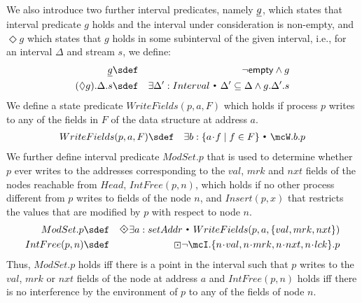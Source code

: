 \documentclass{article}
\def\cdota{\!\cdot\!}
\newcommand{\st}{~{\scriptscriptstyle ^\bullet}~}
\theoremstyle{plain}
\theoremstyle{definition}
\newcommand{\Empty}{{\sf empty}}
\newcommand{\Always}{\textstyle\mathord{\boxdot}}
\newcommand{\Sometime}{\raisebox{0.1em}{\rotatebox[origin=c]{45}{$\textstyle\boxdot$}}}
\begin{document}
We also introduce two further interval predicates, namely $\underline{ g}$,
which states that interval predicate $g$ holds and the interval under
consideration is non-empty, and $\Diamond g$ which states that $g$
holds in some subinterval of the given interval, i.e., for an interval
$\Delta$ and stream $s$, we define: 
\begin{eqnarray*}
  \NE{g}
  & \sdef &  \neg \Empty \land g \\
  (\Diamond g).\Delta.s & \sdef & \exists \Delta' : Interval \st
  \Delta' \subseteq \Delta \land g.\Delta'.s
\end{eqnarray*}
We define a state predicate $WriteFields(p, a, F)$ which holds if
process $p$ writes to any of the fields in $F$ of the data structure
at address $a$.
\begin{eqnarray*}
  WriteFields(p, a, F) & \sdef & \exists b : \{a 
  \cdota f \mid f \in F\} \st 
  \mcW.b.p
\end{eqnarray*}
We further define interval predicate $ModSet.p$ that is used to
determine whether $p$ ever writes to the addresses corresponding to
the $val$, $mrk$ and $nxt$ fields of the nodes reachable from $Head$,
$IntFree(p,n)$, which holds if no other process different from $p$
writes to fields of the node $n$, and $Insert(p, x)$ that restricts the
values that are modified by $p$ with respect to node $n$.
\begin{eqnarray*}
ModSet.p & \sdef & 
\Sometime \exists a :  setAddr \st WriteFields(p,a,\{ val,  mrk,
nxt\})
\\
IntFree(p, n) & \sdef & \Always \neg \mcI.\{n \cdota val, n \cdota mrk, 
n \cdota nxt, n \cdota lck\}.p 
\end{eqnarray*}
Thus, $ModSet.p$ holds iff there is a point in the interval such that
$p$ writes to the $val$, $mrk$ or $nxt$ fields of the node at address
$a$ and $IntFree(p, n)$ holds iff there is no interference by the
environment of $p$ to any of the fields of node $n$.
\end{document}
